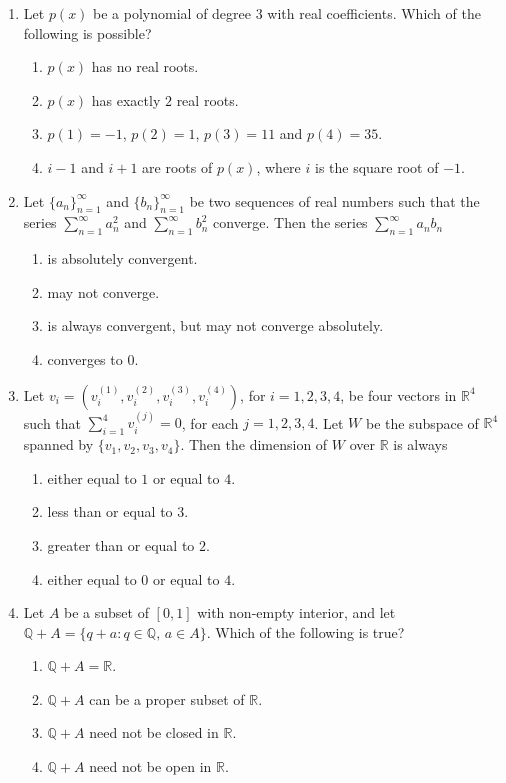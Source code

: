 \documentclass[11pt, a4paper]{article}
\begin{document}
\begin{enumerate}
  \item Let $p(x)$ be a polynomial of degree $3$ with real coefficients. Which of the following is possible?
  \begin{enumerate}[label=\Alph*.]
    \item $p(x)$ has no real roots.
    \item $p(x)$ has exactly $2$ real roots.
    \item $p(1) = -1$, $p(2) = 1$, $p(3) = 11$ and $p(4) = 35$.
    \item $i - 1$ and $i + 1$ are roots of $p(x)$, where $i$ is the square root of $-1$.
  \end{enumerate}

  \item Let $\{a_n\}_{n=1}^\infty$ and $\{b_n\}_{n=1}^\infty$ be two sequences of real numbers such that the series $\sum_{n=1}^\infty a_n^2$ and $\sum_{n=1}^\infty b_n^2$ converge. Then the series $\sum_{n=1}^\infty a_n b_n$
  \begin{enumerate}[label=\Alph*.]
    \item is absolutely convergent.
    \item may not converge.
    \item is always convergent, but may not converge absolutely.
    \item converges to $0$.
  \end{enumerate}

  \item Let $v_i = (v_i^{(1)}, v_i^{(2)}, v_i^{(3)}, v_i^{(4)})$, for $i = 1, 2, 3, 4$, be four vectors in $\mathbb{R}^4$ such that $\sum_{i=1}^4 v_i^{(j)} = 0$, for each $j = 1, 2, 3, 4$. Let $W$ be the subspace of $\mathbb{R}^4$ spanned by $\{v_1, v_2, v_3, v_4\}$. Then the dimension of $W$ over $\mathbb{R}$ is always
  \begin{enumerate}[label=\Alph*.]
    \item either equal to $1$ or equal to $4$.
    \item less than or equal to $3$.
    \item greater than or equal to $2$.
    \item either equal to $0$ or equal to $4$.
  \end{enumerate}

  \item Let $A$ be a subset of $[0, 1]$ with non-empty interior, and let $\mathbb{Q} + A = \{q + a : q \in \mathbb{Q}, \, a \in A\}$. Which of the following is true?
  \begin{enumerate}[label=\Alph*.]
    \item $\mathbb{Q} + A = \mathbb{R}$.
    \item $\mathbb{Q} + A$ can be a proper subset of $\mathbb{R}$.
    \item $\mathbb{Q} + A$ need not be closed in $\mathbb{R}$.
    \item $\mathbb{Q} + A$ need not be open in $\mathbb{R}$.
  \end{enumerate}


\end{enumerate}
\end{document}
